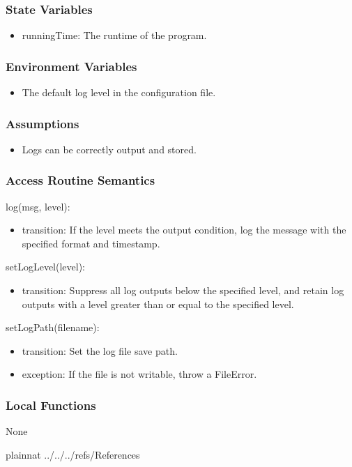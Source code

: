 \documentclass[12pt, titlepage]{article}
\begin{document}
\subsubsection{State Variables}

\begin{itemize}
\item runningTime: The runtime of the program.
\end{itemize}

\subsubsection{Environment Variables}

\begin{itemize}
\item The default log level in the configuration file.
\end{itemize}

\subsubsection{Assumptions}

\begin{itemize}
\item Logs can be correctly output and stored.
\end{itemize}

\subsubsection{Access Routine Semantics}

\noindent log(msg, level):
\begin{itemize}
\item transition: If the level meets the output condition, log the message with
the specified format and timestamp.
\end{itemize}

\noindent setLogLevel(level):
\begin{itemize}
\item transition: Suppress all log outputs below the specified level, and retain
log outputs with a level greater than or equal to the specified level.
\end{itemize}

\noindent setLogPath(filename):
\begin{itemize}
\item transition: Set the log file save path.
\item exception: If the file is not writable, throw a FileError.
\end{itemize}

\subsubsection{Local Functions}

None

\newpage

 {plainnat}
 {../../../refs/References}



\end{document}
